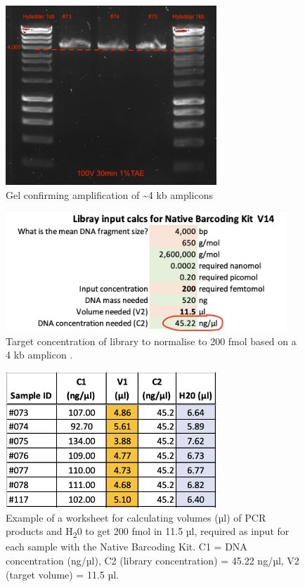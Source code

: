 \documentclass[
]{book}
\begin{document}
\hfill\break

\begin{figure}
\centering
\includegraphics[width=3.125in,height=\textheight]{./img/PCR_gel.jpg}
\caption{Gel confirming amplification of \textasciitilde4 kb amplicons}
\end{figure}

\hfill\break

\begin{figure}
\centering
\includegraphics[width=4.16667in,height=\textheight]{./img/PCR_minDNA.png}
\caption{Target concentration of library to normalise to 200 fmol based on a 4 kb amplicon .}
\end{figure}

\hfill\break

\begin{figure}
\centering
\includegraphics[width=3.125in,height=\textheight]{./img/PCR_C1V1.png}
\caption{Example of a worksheet for calculating volumes (µl) of PCR products and H\textsubscript{2}0 to get 200 fmol in 11.5 µl, required as input for each sample with the Native Barcoding Kit. C1 = DNA concentration (ng/µl), C2 (library concentration) = 45.22 ng/µl, V2 (target volume) = 11.5 µl.}
\end{figure}
\end{document}
